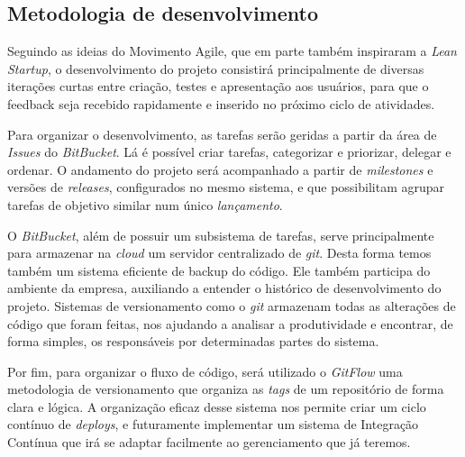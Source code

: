 \documentclass[12pt,a4paper,twoside,hyphens,english,brazil]{abntex2}
\begin{document}
\subsection{Metodologia de desenvolvimento}
Seguindo as ideias do Movimento Agile\cite{agile}, que em parte também inspiraram a \emph{Lean Startup}, o desenvolvimento do projeto consistirá principalmente de diversas iterações curtas entre criação, testes e apresentação aos usuários, para que o feedback seja recebido rapidamente e inserido no próximo ciclo de atividades.

Para organizar o desenvolvimento, as tarefas serão geridas a partir da área de \emph{Issues} do \emph{BitBucket}. Lá é possível criar tarefas, categorizar e priorizar, delegar e ordenar. O andamento do projeto será acompanhado a partir de \emph{milestones} e versões de \emph{releases}, configurados no mesmo sistema, e que possibilitam agrupar tarefas de objetivo similar num único \emph{lançamento}.

O \emph{BitBucket}, além de possuir um subsistema de tarefas, serve principalmente para armazenar na \emph{cloud} um servidor centralizado de \emph{git}. Desta forma temos também um sistema eficiente de backup do código. Ele também participa do ambiente da empresa, auxiliando a entender o histórico de desenvolvimento do projeto. Sistemas de versionamento como o \emph{git} armazenam todas as alterações de código que foram feitas, nos ajudando a analisar a produtividade e encontrar, de forma simples, os responsáveis por determinadas partes do sistema.

Por fim, para organizar o fluxo de código, será utilizado o \emph{GitFlow}\cite{gitflow} uma metodologia de versionamento que organiza as \emph{tags} de um repositório de forma clara e lógica. A organização eficaz desse sistema nos permite criar um ciclo contínuo de \emph{deploys}, e futuramente implementar um sistema de Integração Contínua\footnotemark{} que irá se adaptar facilmente ao gerenciamento que já teremos.

\end{document}

